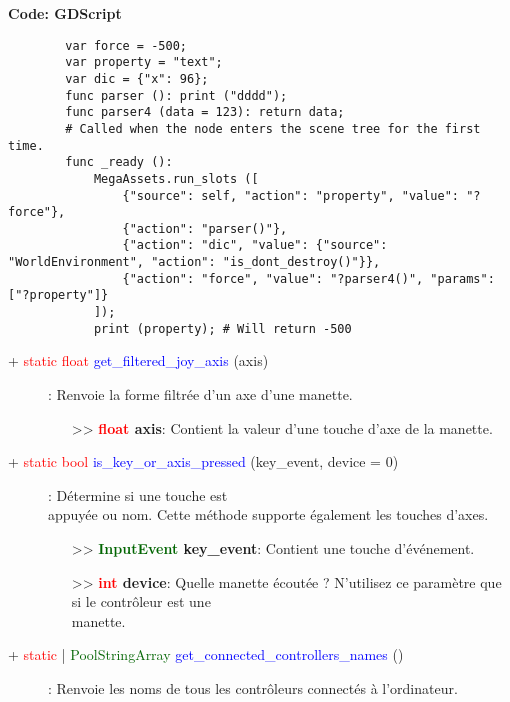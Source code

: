 \documentclass[a4paper, 11pt]{article}
\begin{document}
	\textbf{Code: GDScript}
	\begin{lstlisting}
		var force = -500;
		var property = "text";
		var dic = {"x": 96};
		func parser (): print ("dddd");
		func parser4 (data = 123): return data;
		# Called when the node enters the scene tree for the first time.
		func _ready ():
			MegaAssets.run_slots ([
				{"source": self, "action": "property", "value": "?force"},
				{"action": "parser()"},
				{"action": "dic", "value": {"source": "WorldEnvironment", "action": "is_dont_destroy()"}},
				{"action": "force", "value": "?parser4()", "params": ["?property"]}
			]);
			print (property); # Will return -500
	\end{lstlisting}
	\begin{description}
		\item [+ \textcolor{red}{static float} \textcolor{blue}{get\_filtered\_joy\_axis} (axis)]: Renvoie 
		la forme filtrée d'un axe d'une manette.
		\begin{itemize}
			\item[>> \textbf{\textcolor{red}{float} axis}:] Contient la valeur d'une touche d'axe de la 
			manette.\\
		\end{itemize}
	\end{description}
	\begin{description}
		\item [+ \textcolor{red}{static bool} \textcolor{blue}{is\_key\_or\_axis\_pressed} (key\_event,
		device = 0)]: Détermine si une touche est \\appuyée ou nom. Cette méthode supporte également les 
		touches d'axes.
		\begin{itemize}
			\item[>> \textbf{\textcolor{darkgreen}{InputEvent} key\_event}:] Contient une touche 
			d'événement.
			\item[>> \textbf{\textcolor{red}{int} device}:] Quelle manette écoutée ? N'utilisez ce paramètre 
			que si le contrôleur est une \\manette.\\
		\end{itemize}
	\end{description}
	\begin{description}
		\item [+ \textcolor{red}{static} | \textcolor{darkgreen}{PoolStringArray} \textcolor{blue}
		{get\_connected\_controllers\_names} ()]: Renvoie les noms de tous les contrôleurs connectés à 
		l'ordinateur.\\
	\end{description}
\end{document}
